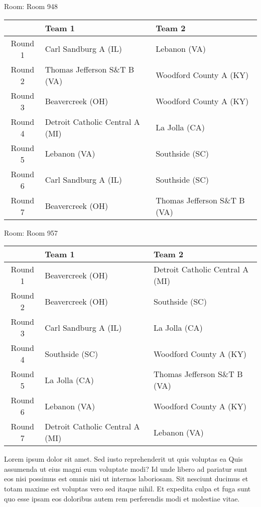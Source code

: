 \documentclass{article}%
\begin{document}
\vspace*{8pt}%
\linebreak%
\begin{flushleft}%
\begin{Large}%
Room: Room 948%
\end{Large}%
\end{flushleft}%
\begin{tabularx}{\textwidth}{|c|Y|Y|}%
\hline%
&Team 1&Team 2\\%
\hline%
Round 1&Carl Sandburg A (IL)&Lebanon (VA)\\%
Round 2&Thomas Jefferson S\&T B (VA)&Woodford County A (KY)\\%
Round 3&Beavercreek (OH)&Woodford County A (KY)\\%
Round 4&Detroit Catholic Central A (MI)&La Jolla (CA)\\%
Round 5&Lebanon (VA)&Southside (SC)\\%
Round 6&Carl Sandburg A (IL)&Southside (SC)\\%
Round 7&Beavercreek (OH)&Thomas Jefferson S\&T B (VA)\\%
\hline%
\end{tabularx}%
\vspace*{8pt}%
\linebreak%
\begin{flushleft}%
\begin{Large}%
Room: Room 957%
\end{Large}%
\end{flushleft}%
\begin{tabularx}{\textwidth}{|c|Y|Y|}%
\hline%
&Team 1&Team 2\\%
\hline%
Round 1&Beavercreek (OH)&Detroit Catholic Central A (MI)\\%
Round 2&Beavercreek (OH)&Southside (SC)\\%
Round 3&Carl Sandburg A (IL)&La Jolla (CA)\\%
Round 4&Southside (SC)&Woodford County A (KY)\\%
Round 5&La Jolla (CA)&Thomas Jefferson S\&T B (VA)\\%
Round 6&Lebanon (VA)&Woodford County A (KY)\\%
Round 7&Detroit Catholic Central A (MI)&Lebanon (VA)\\%
\hline%
\end{tabularx}%
\vspace*{8pt}%
\linebreak%
\newline%
Lorem ipsum dolor sit amet. Sed iusto reprehenderit ut quis voluptas ea Quis assumenda ut eius magni eum voluptate modi? Id unde libero ad pariatur sunt eos nisi possimus est omnis nisi ut internos laboriosam. Sit nesciunt ducimus et totam maxime est voluptas vero sed itaque nihil. Et expedita culpa et fuga sunt quo esse ipsam eos doloribus autem rem perferendis modi et molestiae vitae.\newline%
\end{document}
